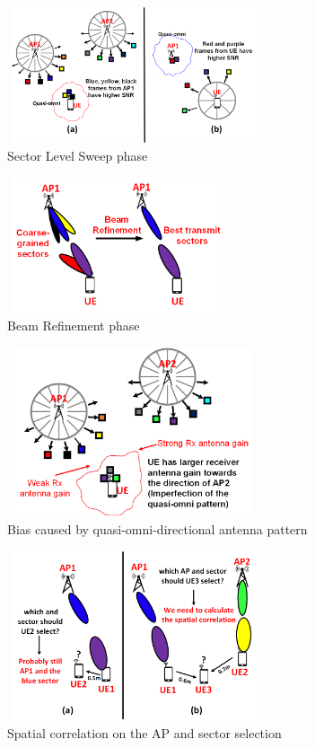 \documentclass[conference]{IEEEtran}
\begin{document}
\begin{figure}
	\centerline{\includegraphics[width=7.5cm,height=4cm]{sls}}
	\caption[U-example]{Sector Level Sweep phase}
\end{figure}
\begin{figure}
	\centerline{\includegraphics[width=6.5cm,height=4cm]{brp}}
	\caption[U-example]{Beam Refinement phase}
\end{figure}
\begin{figure}
	\centerline{\includegraphics[width=7.5cm,height=5cm]{quasiproblem}}
	\caption[U-example]{Bias caused by quasi-omni-directional antenna pattern}
\end{figure}
\begin{figure}[t!]
	\centerline{\includegraphics[width=7.5cm,height=5cm]{motivation}}
	\caption[U-example]{Spatial correlation on the AP and sector selection}
\end{figure}
\end{document}
